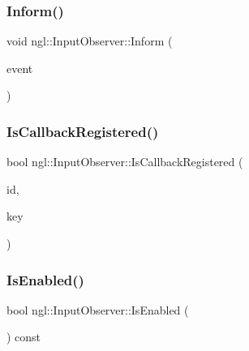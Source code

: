 \mbox{\label{classngl_1_1_input_observer_ae3952d18e310683a24be067ab6789dc1}} 
\subsubsection{\texorpdfstring{Inform()}{Inform()}}
{\footnotesize\ttfamily void ngl\+::\+Input\+Observer\+::\+Inform (\begin{DoxyParamCaption}\item[{const \mbox{\hyperlink{structngl_1_1_input_event}{Input\+Event}} \&}]{event }\end{DoxyParamCaption})}

\mbox{\label{classngl_1_1_input_observer_a2e1e9c403c0acd2b1c60ad35019605c5}} 
\subsubsection{\texorpdfstring{Is\+Callback\+Registered()}{IsCallbackRegistered()}}
{\footnotesize\ttfamily bool ngl\+::\+Input\+Observer\+::\+Is\+Callback\+Registered (\begin{DoxyParamCaption}\item[{const std\+::string \&}]{id,  }\item[{\mbox{\hyperlink{namespacengl_a5b20ff50635da5e3adb6bec00c062497}{Event\+Key\+\_\+T}}}]{key }\end{DoxyParamCaption})}

\mbox{\label{classngl_1_1_input_observer_abef3ad4239a2d189d92997455be5aa35}} 
\subsubsection{\texorpdfstring{Is\+Enabled()}{IsEnabled()}}
{\footnotesize\ttfamily bool ngl\+::\+Input\+Observer\+::\+Is\+Enabled (\begin{DoxyParamCaption}{ }\end{DoxyParamCaption}) const\hspace{0.3cm}{\ttfamily [virtual]}}

